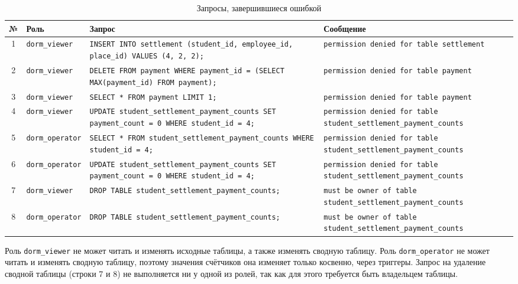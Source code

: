 \begin{table}[H]
\centering
\caption{Запросы, завершившиеся ошибкой}
\label{tab:denied}
\small
\begin{tabularx}{\textwidth}{|c|>{\raggedright\arraybackslash}p{2.6cm}|>{\raggedright\arraybackslash}X|>{\raggedright\arraybackslash}X|}
\hline
\textbf{№} & \textbf{Роль} & \textbf{Запрос} & \textbf{Сообщение} \\ \hline
1 & \texttt{dorm\_viewer} & \texttt{INSERT INTO settlement (student\_id, employee\_id, place\_id) VALUES (4, 2, 2);} & \texttt{permission denied for table settlement} \\ \hline
2 & \texttt{dorm\_viewer} & \texttt{DELETE FROM payment WHERE payment\_id = (SELECT MAX(payment\_id) FROM payment);} & \texttt{permission denied for table payment} \\ \hline
3 & \texttt{dorm\_viewer} & \texttt{SELECT * FROM payment LIMIT 1;} & \texttt{permission denied for table payment} \\ \hline
4 & \texttt{dorm\_viewer} & \texttt{UPDATE student\_}\-\texttt{settlement\_}\-\texttt{payment\_}\-\texttt{counts SET payment\_count = 0 WHERE student\_id = 4;} & \texttt{permission denied for table student\_}\-\texttt{settlement\_}\-\texttt{payment\_}\-\texttt{counts} \\ \hline
5 & \texttt{dorm\_operator} & \texttt{SELECT * FROM student\_}\-\texttt{settlement\_}\-\texttt{payment\_}\-\texttt{counts WHERE student\_id = 4;} & \texttt{permission denied for table student\_}\-\texttt{settlement\_}\-\texttt{payment\_}\-\texttt{counts} \\ \hline
6 & \texttt{dorm\_operator} & \texttt{UPDATE student\_}\-\texttt{settlement\_}\-\texttt{payment\_}\-\texttt{counts SET payment\_count = 0 WHERE student\_id = 4;} & \texttt{permission denied for table student\_}\-\texttt{settlement\_}\-\texttt{payment\_}\-\texttt{counts} \\ \hline
7 & \texttt{dorm\_viewer} & \texttt{DROP TABLE student\_}\-\texttt{settlement\_}\-\texttt{payment\_}\-\texttt{counts;} & \texttt{must be owner of table student\_}\-\texttt{settlement\_}\-\texttt{payment\_}\-\texttt{counts} \\ \hline
8 & \texttt{dorm\_operator} & \texttt{DROP TABLE student\_}\-\texttt{settlement\_}\-\texttt{payment\_}\-\texttt{counts;} & \texttt{must be owner of table student\_}\-\texttt{settlement\_}\-\texttt{payment\_}\-\texttt{counts} \\ \hline
\end{tabularx}
\end{table}

Роль \texttt{dorm\_viewer} не может читать и изменять исходные таблицы, а также изменять сводную таблицу. Роль \texttt{dorm\_operator} не может читать и изменять сводную таблицу, поэтому значения счётчиков она изменяет только косвенно, через триггеры. Запрос на удаление сводной таблицы (строки 7 и 8) не выполняется ни у одной из ролей, так как для этого требуется быть владельцем таблицы.